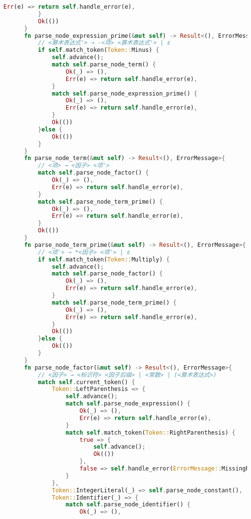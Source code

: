 \begin{lstlisting}[caption={语法分析器parse.rs}, label={4:code-example}, captionpos=t, language=rust]
              Err(e) => return self.handle_error(e),
          }
          Ok(())
      }
      fn parse_node_expression_prime(&mut self) -> Result<(), ErrorMessage>{
          // <算术表达式'> → -<项> <算术表达式'> | ε
          if self.match_token(Token::Minus) {
              self.advance();
              match self.parse_node_term() {
                  Ok(_) => (),
                  Err(e) => return self.handle_error(e),
              }
              match self.parse_node_expression_prime() {
                  Ok(_) => (),
                  Err(e) => return self.handle_error(e),
              }
              Ok(())
          }else { 
              Ok(())
          }
      }
      fn parse_node_term(&mut self) -> Result<(), ErrorMessage>{
          // <项> → <因子> <项'>
          match self.parse_node_factor() {
              Ok(_) => (),
              Err(e) => return self.handle_error(e),
          }
          match self.parse_node_term_prime() {
              Ok(_) => (),
              Err(e) => return self.handle_error(e),
          }
          Ok(())
      }
      fn parse_node_term_prime(&mut self) -> Result<(), ErrorMessage>{
          // <项'> → *<因子> <项'> | ε
          if self.match_token(Token::Multiply) {
              self.advance();
              match self.parse_node_factor() {
                  Ok(_) => (),
                  Err(e) => return self.handle_error(e),
              }
              match self.parse_node_term_prime() {
                  Ok(_) => (),
                  Err(e) => return self.handle_error(e),
              }
              Ok(())
          }else {
              Ok(())
          }
      }
      fn parse_node_factor(&mut self) -> Result<(), ErrorMessage>{
          // <因子> → <标识符> <因子后缀> | <常数> | (<算术表达式>)
          match self.current_token() {
              Token::LeftParenthesis => {
                  self.advance();
                  match self.parse_node_expression() {
                      Ok(_) => (),
                      Err(e) => return self.handle_error(e),
                  }
                  match self.match_token(Token::RightParenthesis) {
                      true => {
                          self.advance();
                          Ok(())
                      },
                      false => self.handle_error(ErrorMessage::MissingRightParenthesis)
                  }
              },
              Token::IntegerLiteral(_) => self.parse_node_constant(),
              Token::Identifier(_) => {
                  match self.parse_node_identifier() {
                      Ok(_) => (),

\end{lstlisting}
